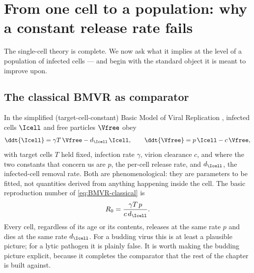 
\section{From one cell to a population: why a constant release rate fails}
\label{sec:why-constant-fails}

The single-cell theory is complete. We now ask what it implies at the level
of a population of infected cells --- and begin with the standard object it
is meant to improve upon.

\subsection{The classical BMVR as comparator}
\label{sec:bmvr-classical}

In the simplified (target-cell-constant) Basic Model of Viral Replication
\cite{mclean1993balance,nowak1996population,perelson1996hiv}, infected
cells $\Icell$ and free particles $\Vfree$ obey
\begin{equation}
\ddt{\Icell} = \gamma T\,\Vfree - d_{\Icell}\,\Icell,
\qquad
\ddt{\Vfree} = p\,\Icell - c\,\Vfree,
\label{eq:BMVR-classical}
\end{equation}
with target cells $T$ held fixed, infection rate $\gamma$, virion clearance
$c$, and where the two constants that concern us are $p$, the per-cell
release rate, and $d_{\Icell}$, the infected-cell removal rate. Both are
phenomenological: they are parameters to be fitted, not quantities derived
from anything happening inside the cell. The basic reproduction number of
\eqref{eq:BMVR-classical} is
\begin{equation}
R_0=\frac{\gamma T\,p}{c\,d_{\Icell}}.
\end{equation}
Every cell, regardless of its age or its contents, releases at the same rate
$p$ and dies at the same rate $d_{\Icell}$. For a budding virus this is at
least a plausible picture; for a lytic pathogen it is plainly false. It is
worth making the budding picture explicit, because it completes the
comparator that the rest of the chapter is built against.

